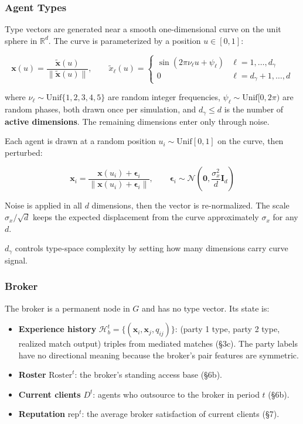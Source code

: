 \documentclass[11pt]{article}
\providecommand{\tightlist}{%
  \setlength{\itemsep}{0pt}\setlength{\parskip}{0pt}}
\begin{document}
\subsubsection{Agent Types}\label{agent-types}

Type vectors are generated near a smooth one-dimensional curve on the unit sphere in \(\mathbb{R}^d\). The curve is parameterized by a position \(u \in [0, 1]\):

\[\mathbf{x}(u) = \frac{\tilde{\mathbf{x}}(u)}{\|\tilde{\mathbf{x}}(u)\|}, \qquad \tilde{x}_\ell(u) = \begin{cases} \sin(2\pi \nu_\ell u + \psi_\ell) & \ell = 1, \ldots, d_\gamma \\ 0 & \ell = d_\gamma+1, \ldots, d \end{cases}\]

where \(\nu_\ell \sim \mathrm{Unif}\{1, 2, 3, 4, 5\}\) are random integer frequencies, \(\psi_\ell \sim \mathrm{Unif}[0, 2\pi)\) are random phases, both drawn once per simulation, and \(d_\gamma \leq d\) is the number of \textbf{active dimensions}. The remaining dimensions enter only through noise.

Each agent is drawn at a random position \(u_i \sim \mathrm{Unif}[0,1]\) on the curve, then perturbed:

\[\mathbf{x}_i = \frac{\mathbf{x}(u_i) + \boldsymbol{\epsilon}_i}{\|\mathbf{x}(u_i) + \boldsymbol{\epsilon}_i\|}, \qquad \boldsymbol{\epsilon}_i \sim \mathcal{N}\!\left(\mathbf{0}, \frac{\sigma_x^2}{d} \mathbf{I}_d\right)\]

Noise is applied in all \(d\) dimensions, then the vector is re-normalized. The scale \(\sigma_x / \sqrt{d}\) keeps the expected displacement from the curve approximately \(\sigma_x\) for any \(d\).

\(d_\gamma\) controls type-space complexity by setting how many dimensions carry curve signal.

\subsubsection{Broker}\label{broker}

The broker is a permanent node in \(G\) and has no type vector. Its state is:

\begin{itemize}
\tightlist
\item \textbf{Experience history} \(\mathcal{H}_b^t = \{(\mathbf{x}_i, \mathbf{x}_j, q_{ij})\}\): (party 1 type, party 2 type, realized match output) triples from mediated matches (§3c). The party labels have no directional meaning because the broker's pair features are symmetric.
\item \textbf{Roster} \(\text{Roster}^t\): the broker's standing access base (§6b).
\item \textbf{Current clients} \(D^t\): agents who outsource to the broker in period \(t\) (§6b).
\item \textbf{Reputation} \(\text{rep}^t\): the average broker satisfaction of current clients (§7).
\end{itemize}
\end{document}
